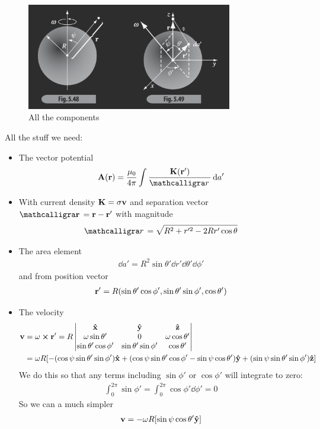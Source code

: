\documentclass[../main.tex]{subfiles}
\begin{document}
\begin{figure}[ht]
    \centering
    \includegraphics[width=0.8\textwidth]{fig5_48_49.png}
    \caption{All the components}
    \label{fig:fig5_48}
\end{figure}
All the stuff we need:
\begin{itemize}
    \item The vector potential
    \begin{align*}
        \vb A (\vb r) = \frac{\mu_0}{4\pi} \int \frac{\vb K (\vb r')}{\scriptr} \dd{a'}
    \end{align*}
    \item With current density $\vb K = \sigma \vb v$ and separation vector $\vb \scriptr = \vb r - \vb r'$ with magnitude
    \begin{align*}
        \scriptr = \sqrt{R^2 + r'^2 - 2Rr' \cos\theta}
    \end{align*}
    \item The area element
    \begin{align*}
        \dd{a'} = R^2 \sin\theta' \dd{r'} \dd{\theta'} \dd{\phi'}
    \end{align*}
    and from position vector
    \begin{align*}
        \vb r' = R(\sin\theta' \cos\phi', \sin\theta' \sin\phi', \cos\theta')
    \end{align*}
    \item The velocity
    \begin{align*}
        \vb v &= \vb \omega \cross \vb r' = R \begin{vmatrix}
            \vu x & \vu y & \vu z \\
            \omega \sin\theta' & 0 & \omega \cos\theta' \\
            \sin\theta' \cos\phi' & \sin\theta' \sin\phi' & \cos\theta'
        \end{vmatrix} \\
        &= \omega R \qt[
            -(\cos\psi \sin\theta' \sin\phi') \vu x
            + (\cos\psi \sin\theta' \cos\phi' - \sin\psi \cos\theta') \vu y
            + (\sin\psi \sin\theta' \sin\phi') \vu z
        ]
    \end{align*}
    We do this so that any terms including $\sin\phi'$ or $\cos\phi'$ will integrate to zero:
    \begin{align*}
        \int_0^{2\pi} \sin\phi' = \int_0^{2\pi} \cos\phi' \dd{\phi'} = 0
    \end{align*}
    So we can a much simpler
    \begin{align*}
        \vb v = -\omega R \qt[
            \sin\psi \cos\theta' \vu y
        ]
    \end{align*}
\end{itemize}
\end{document}
